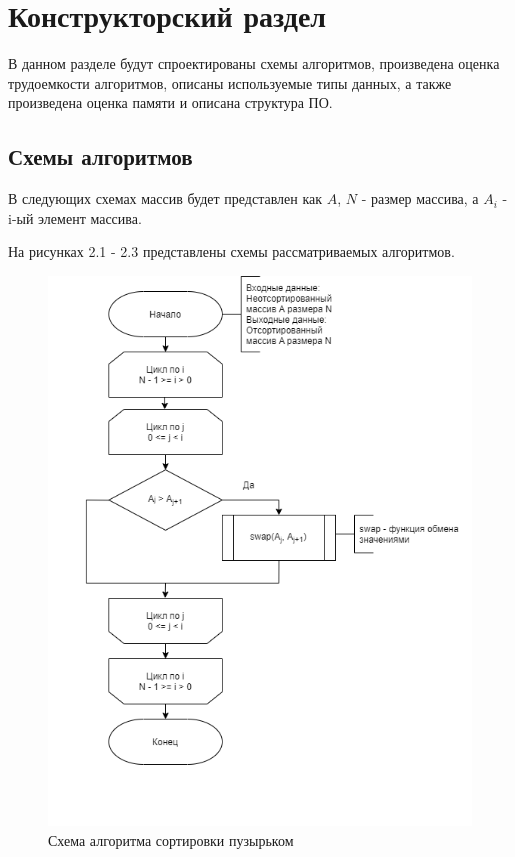 \chapter{Конструкторский раздел}

В данном разделе будут спроектированы схемы алгоритмов, произведена оценка трудоемкости алгоритмов, описаны используемые типы данных, а также произведена оценка памяти и описана структура ПО.

\section{Схемы алгоритмов}

В следующих схемах массив будет представлен как $A$, $N$ - размер массива, а $A_{i}$ - i-ый элемент массива.

На рисунках 2.1 - 2.3 представлены схемы рассматриваемых алгоритмов.
 
\newpage
\begin{figure}[h!]
	\begin{center}
		\includegraphics[scale=0.6]{assets/bubbleSort.png}
	\end{center}
	\caption{Схема алгоритма сортировки пузырьком}
\end{figure}

